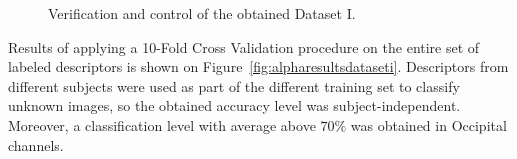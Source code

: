 \begin{figure}[h!]
\centering
{}
\caption[Power Spectral Density of the Dataset I]{Verification and control of the obtained Dataset I.}
\label{fig:psd}
\end{figure}
   
Results of applying a 10-Fold Cross Validation procedure on the entire set of labeled descriptors is shown on Figure~\ref{fig:alpharesultsdataseti}.  Descriptors from different subjects were used as part of the different training set to classify unknown images, so the obtained accuracy level was subject-independent.  Moreover, a classification level with average above $70\%$ was obtained in Occipital channels.
   
